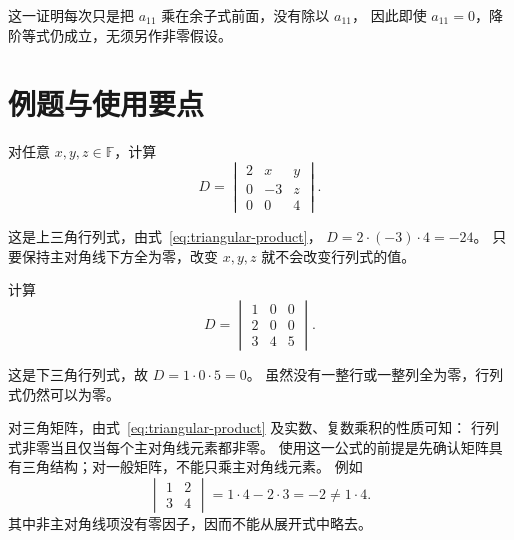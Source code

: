 \documentclass[UTF8,12pt,a4paper,fontset=fandol]{ctexart}
\begin{document}
这一证明每次只是把 $a_{11}$ 乘在余子式前面，没有除以 $a_{11}$，
因此即使 $a_{11}=0$，降阶等式仍成立，无须另作非零假设。

\section{例题与使用要点}

\begin{example}[非对角元素不影响三角行列式的值]
对任意 $x,y,z\in\mathbb F$，计算
\[
  D=\begin{vmatrix}
    2&x&y\\
    0&-3&z\\
    0&0&4
  \end{vmatrix}.
\]
\end{example}

\begin{solve}
这是上三角行列式，由式~\eqref{eq:triangular-product}，
$D=2\cdot(-3)\cdot4=-24$。
只要保持主对角线下方全为零，改变 $x,y,z$ 就不会改变行列式的值。
\end{solve}

\begin{example}[对角元素可以为零]
计算
\[
  D=\begin{vmatrix}
    1&0&0\\
    2&0&0\\
    3&4&5
  \end{vmatrix}.
\]
\end{example}

\begin{solve}
这是下三角行列式，故 $D=1\cdot0\cdot5=0$。
虽然没有一整行或一整列全为零，行列式仍然可以为零。
\end{solve}

对三角矩阵，由式~\eqref{eq:triangular-product} 及实数、复数乘积的性质可知：
行列式非零当且仅当每个主对角线元素都非零。
使用这一公式的前提是先确认矩阵具有三角结构；对一般矩阵，不能只乘主对角线元素。
例如
\[
  \begin{vmatrix}1&2\\3&4\end{vmatrix}
  =1\cdot4-2\cdot3=-2\ne1\cdot4.
\]
其中非主对角线项没有零因子，因而不能从展开式中略去。
\end{document}

